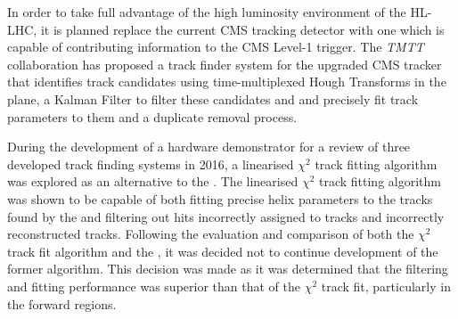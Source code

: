 

%
%


In order to take full advantage of the high luminosity environment of the HL-LHC, it is planned replace the current CMS tracking detector with one which is capable of contributing information to the CMS Level-1 trigger.
The \emph{TMTT} collaboration has proposed a track finder system for the upgraded CMS tracker that identifies track candidates using time-multiplexed Hough Transforms in the \rphi plane, a Kalman Filter to filter these candidates and and precisely fit track parameters to them and a duplicate removal process.

During the development of a hardware demonstrator for a review of three developed track finding systems in 2016, a linearised $\chi^{2}$ track fitting algorithm was explored as an alternative to the \KF.
The linearised $\chi^{2}$ track fitting algorithm was shown to be capable of both fitting precise helix parameters to the tracks found by the \HT and filtering out hits incorrectly assigned to tracks and incorrectly reconstructed tracks.
Following the evaluation and comparison of both the $\chi^{2}$ track fit algorithm and the \KF, it was decided not to continue development of the former algorithm.
This decision was made as it was determined that the \KF filtering and fitting performance was superior than that of the $\chi^{2}$ track fit, particularly in the forward regions.

